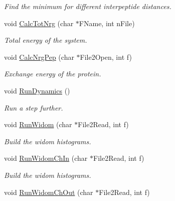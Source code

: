 \begin{DoxyCompactItemize}
\begin{DoxyCompactList}\small\item\em Find the minimum for different interpeptide distances. \end{DoxyCompactList}\item 
void \hyperlink{classForces_aa82709db8e55cc620cfbfb483489f5b6}{Calc\+Tot\+Nrg} (char $\ast$F\+Name, int n\+File)\hypertarget{classForces_aa82709db8e55cc620cfbfb483489f5b6}{}\label{classForces_aa82709db8e55cc620cfbfb483489f5b6}

\begin{DoxyCompactList}\small\item\em Total energy of the system. \end{DoxyCompactList}\item 
void \hyperlink{classForces_a6a491826bd0df50e5d4941710783a54c}{Calc\+Nrg\+Pep} (char $\ast$File2\+Open, int f)\hypertarget{classForces_a6a491826bd0df50e5d4941710783a54c}{}\label{classForces_a6a491826bd0df50e5d4941710783a54c}

\begin{DoxyCompactList}\small\item\em Exchange energy of the protein. \end{DoxyCompactList}\item 
void \hyperlink{classForces_aadef342da0e2abb136031d2df4c264bf}{Run\+Dynamics} ()\hypertarget{classForces_aadef342da0e2abb136031d2df4c264bf}{}\label{classForces_aadef342da0e2abb136031d2df4c264bf}

\begin{DoxyCompactList}\small\item\em Run a step further. \end{DoxyCompactList}\item 
void \hyperlink{classForces_abfa5f0b075c87a5ae914d91c5481c359}{Run\+Widom} (char $\ast$File2\+Read, int f)\hypertarget{classForces_abfa5f0b075c87a5ae914d91c5481c359}{}\label{classForces_abfa5f0b075c87a5ae914d91c5481c359}

\begin{DoxyCompactList}\small\item\em Build the widom histograms. \end{DoxyCompactList}\item 
void \hyperlink{classForces_ac313c324785f5c7c044e2e94ea39c01c}{Run\+Widom\+Ch\+In} (char $\ast$File2\+Read, int f)\hypertarget{classForces_ac313c324785f5c7c044e2e94ea39c01c}{}\label{classForces_ac313c324785f5c7c044e2e94ea39c01c}

\begin{DoxyCompactList}\small\item\em Build the widom histograms. \end{DoxyCompactList}\item 
void \hyperlink{classForces_a6c88528ae5cf46ad5cc7080ca47ef1fb}{Run\+Widom\+Ch\+Out} (char $\ast$File2\+Read, int f)\hypertarget{classForces_a6c88528ae5cf46ad5cc7080ca47ef1fb}{}\label{classForces_a6c88528ae5cf46ad5cc7080ca47ef1fb}


\end{DoxyCompactItemize}
